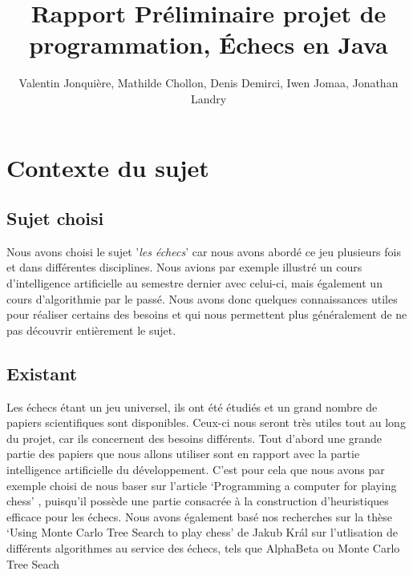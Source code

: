 \documentclass{article}
\author{
    Valentin Jonquière,
    Mathilde Chollon,
    Denis Demirci,
    Iwen Jomaa,
    Jonathan Landry
}
\title{Rapport Préliminaire projet de programmation, Échecs en Java}
\begin{document}
\maketitle

\pagebreak

\tableofcontents

\pagebreak

\section{Contexte du sujet}
\subsection{Sujet choisi}
Nous avons choisi le sujet '\textit{les échecs}' car nous avons abordé ce jeu
plusieurs fois et dans différentes disciplines. Nous avions par exemple illustré un 
cours d'intelligence artificielle au semestre dernier avec celui-ci, mais 
également un cours d'algorithmie par le passé. Nous avons donc quelques connaissances 
utiles pour réaliser certains des besoins et qui nous permettent plus généralement de ne pas
découvrir entièrement le sujet.

\subsection{Existant}
Les échecs étant un jeu universel, ils ont été étudiés et un grand nombre de papiers scientifiques
sont disponibles. Ceux-ci nous seront très utiles tout au long du projet, car ils concernent des
besoins différents. Tout d'abord une grande partie des papiers que nous allons utiliser sont en rapport
avec la partie intelligence artificielle du développement. C'est pour cela que nous avons par exemple
choisi de nous baser sur l'article `Programming a computer for playing chess' \cite{Shannon1950}, 
puisqu'il possède une partie consacrée à la construction d'heuristiques efficace pour les échecs.
Nous avons également basé nos recherches sur la thèse `Using Monte Carlo Tree Search to play chess' \cite{Kral2021}
de Jakub Král sur l'utlisation de différents algorithmes au service des échecs, tels que AlphaBeta ou
Monte Carlo Tree Seach  \cite{ZobristHashing}
\end{document}
